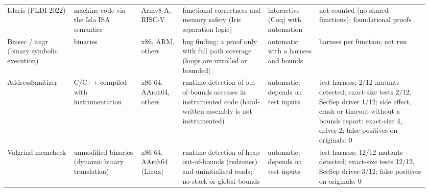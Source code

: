 \begin{tabularx}{\textwidth}{>{\raggedright}p{2.2cm}>{\raggedright}p{2.6cm}>{\raggedright}p{1.5cm}>{\raggedright}X>{\raggedright}p{2.4cm}>{\raggedright\arraybackslash}X}
Islaris (PLDI 2022) & machine code via the Isla ISA semantics & Armv8-A, RISC-V & functional correctness and memory safety (Iris separation logic) & interactive (Coq) with automation & not counted (no shared functions); foundational proofs\\
Binsec / angr (binary symbolic execution) & binaries & x86, ARM, others & bug finding; a proof only with full path coverage (loops are unrolled or bounded) & automatic with a harness and bounds & harness per function; not run\\
AddressSanitizer & C/C++ compiled with instrumentation & x86-64, AArch64, others & runtime detection of out-of-bounds accesses in instrumented code (hand-written assembly is not instrumented) & automatic; depends on test inputs & test harness; 2/12 mutants detected; exact-size tests 2/12, SecSep driver 1/12; side effect, crash or timeout without a bounds report: exact-size 4, driver 2; false positives on originals: 0\\
Valgrind memcheck & unmodified binaries (dynamic binary translation) & x86-64, AArch64 (Linux) & runtime detection of heap out-of-bounds (redzones) and uninitialised reads; no stack or global bounds & automatic; depends on test inputs & test harness; 12/12 mutants detected; exact-size tests 12/12, SecSep driver 3/12; false positives on originals: 0\\
\bottomrule
\end{tabularx}
